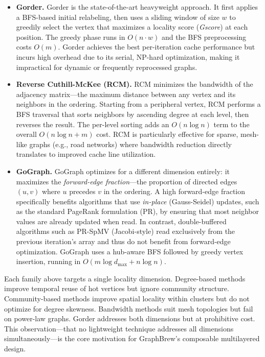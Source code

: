 \documentclass[sigconf, nonacm]{acmart}
\begin{document}
\begin{itemize}[topsep=2pt,itemsep=2pt,wide]
\item \textbf{Gorder.}
Gorder \cite{wei_speedup_2016} is the state-of-the-art heavyweight approach. It first applies a BFS-based initial relabeling, then uses a sliding window of size $w$ to greedily select the vertex that maximizes a locality score (\emph{Gscore}) at each position. The greedy phase runs in $O(n \cdot w)$ and the BFS preprocessing costs $O(m)$. Gorder achieves the best per-iteration cache performance but incurs high overhead due to its serial, NP-hard optimization, making it impractical for dynamic or frequently reprocessed graphs.

\item \textbf{Reverse Cuthill-McKee (RCM).}
RCM \cite{cuthill_reducing_1969} minimizes the bandwidth of the adjacency matrix---the maximum distance between any vertex and its neighbors in the ordering. Starting from a peripheral vertex, RCM performs a BFS traversal that sorts neighbors by ascending degree at each level, then reverses the result. The per-level sorting adds an $O(n\log n)$ term to the overall $O(n\log n + m)$ cost. RCM is particularly effective for sparse, mesh-like graphs (e.g., road networks) where bandwidth reduction directly translates to improved cache line utilization.

\item \textbf{GoGraph.}
GoGraph \cite{zhou_fast_2024} optimizes for a different dimension entirely: it maximizes the \emph{forward-edge fraction}---the proportion of directed edges $(u,v)$ where $u$ precedes $v$ in the ordering. A high forward-edge fraction specifically benefits algorithms that use \emph{in-place} (Gauss-Seidel) updates, such as the standard PageRank formulation (PR), by ensuring that most neighbor values are already updated when read. In contrast, double-buffered algorithms such as PR-SpMV (Jacobi-style) read exclusively from the previous iteration's array and thus do not benefit from forward-edge optimization. GoGraph uses a hub-aware BFS followed by greedy vertex insertion, running in $O(m\log d_{\max} + n\log n)$.
\end{itemize}

Each family above targets a single locality dimension. Degree-based methods improve temporal reuse of hot vertices but ignore community structure. Community-based methods improve spatial locality within clusters but do not optimize for degree skewness. Bandwidth methods suit mesh topologies but fail on power-law graphs. Gorder addresses both dimensions but at prohibitive cost. This observation---that no lightweight technique addresses all dimensions simultaneously---is the core motivation for GraphBrew's composable multilayered design.
\end{document}
